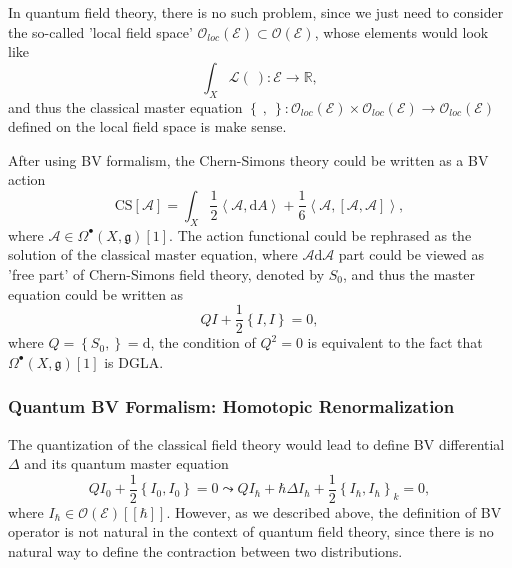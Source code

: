 \documentclass[10pt]{article}
\begin{document}
In quantum field theory, there is no such problem, since we just need to consider the so-called 'local field space' $ \mathcal{O}_{loc}(\mathcal{E}) \subset \mathcal{O}(\mathcal{E})$, whose elements would look like
\begin{equation*}
  \int _{X} \mathcal{L}(~): \mathcal{E} \rightarrow \mathbb{R},
\end{equation*}
and thus the classical master equation $\left\{ ~, ~ \right\} : \mathcal{O}_{loc}(\mathcal{E}) \times \mathcal{O}_{loc}(\mathcal{E}) \rightarrow \mathcal{O}_{loc}(\mathcal{E})$ defined on the local field space is make sense.
\begin{example}
  After using BV formalism, the Chern-Simons theory could be written as a BV action
  \begin{equation*}
    \mathrm{CS}[\mathcal{A}] = \int _{X} \frac{1}{2} \left< \mathcal{A}, \mathrm{d} A \right> + \frac{1}{6} \left< \mathcal{A}, [\mathcal{A}, \mathcal{A}] \right>,
  \end{equation*}
  where $ \mathcal{A} \in \Omega^{\bullet}(X, \mathfrak{g})[1]$. The action functional could be rephrased as the solution of the classical master equation, where $ \mathcal{A}\mathrm{d} \mathcal{A}$ part could be viewed as 'free part' of Chern-Simons field theory, denoted by $ S_0$, and thus the master equation could be written as
  \begin{equation*}
    Q I + \frac{1}{2} \left\{ I, I \right\} = 0,
  \end{equation*}
  where $ Q = \left\{ S_0,  \right\} = \mathrm{d}$, the condition of $ Q^{2} = 0$ is equivalent to the fact that $ \Omega^{\bullet}(X, \mathfrak{g})[1]$ is DGLA.
\end{example}

\subsubsection{Quantum BV Formalism: Homotopic Renormalization}

The quantization of the classical field theory would lead to define BV differential $ \Delta$ and its quantum master equation
\begin{equation*}
  Q I_0 + \frac{1}{2} \left\{ I_0, I_0 \right\} = 0 \leadsto Q I_{\hbar} + \hbar \Delta I_{\hbar} + \frac{1}{2} \left\{ I_{\hbar}, I_{\hbar} \right\}_{k} = 0,
\end{equation*}
where $ I_{\hbar} \in \mathcal{O}(\mathcal{E})[[\hbar]]$.
However, as we described above, the definition of BV operator is not natural in the context of quantum field theory, since there is no natural way to define the contraction between two distributions.
\end{document}
